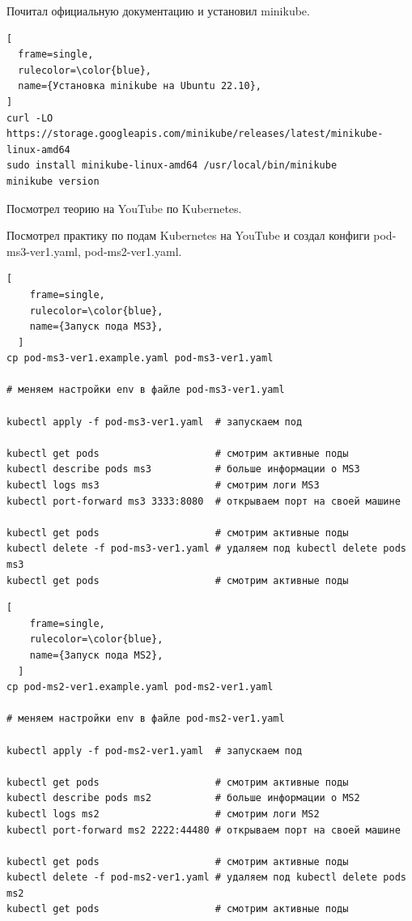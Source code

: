 \documentclass[12pt, a4paper, simple]{eskdtext}
\begin{document}
  Почитал официальную документацию \cite{kubernetes_install_minikube} и установил minikube.

\begin{lstlisting}[
  frame=single,
  rulecolor=\color{blue},
  name={Установка minikube на Ubuntu 22.10},
]
curl -LO https://storage.googleapis.com/minikube/releases/latest/minikube-linux-amd64
sudo install minikube-linux-amd64 /usr/local/bin/minikube
minikube version
\end{lstlisting}

  Посмотрел теорию на YouTube \cite{kubernetes_theory} по Kubernetes.

  Посмотрел практику по подам Kubernetes на YouTube \cite{kubernetes_create_pod} и создал конфиги pod-ms3-ver1.yaml, pod-ms2-ver1.yaml.

  \newpage
  

  \begin{lstlisting}[
    frame=single,
    rulecolor=\color{blue},
    name={Запуск пода MS3},
  ]
cp pod-ms3-ver1.example.yaml pod-ms3-ver1.yaml

# меняем настройки env в файле pod-ms3-ver1.yaml

kubectl apply -f pod-ms3-ver1.yaml  # запускаем под

kubectl get pods                    # смотрим активные поды
kubectl describe pods ms3           # больше информации о MS3
kubectl logs ms3                    # смотрим логи MS3
kubectl port-forward ms3 3333:8080  # открываем порт на своей машине

kubectl get pods                    # смотрим активные поды
kubectl delete -f pod-ms3-ver1.yaml # удаляем под kubectl delete pods ms3
kubectl get pods                    # смотрим активные поды
\end{lstlisting}

  \newpage

  

  \newpage

  \begin{lstlisting}[
    frame=single,
    rulecolor=\color{blue},
    name={Запуск пода MS2},
  ]
cp pod-ms2-ver1.example.yaml pod-ms2-ver1.yaml

# меняем настройки env в файле pod-ms2-ver1.yaml

kubectl apply -f pod-ms2-ver1.yaml  # запускаем под

kubectl get pods                    # смотрим активные поды
kubectl describe pods ms2           # больше информации о MS2
kubectl logs ms2                    # смотрим логи MS2
kubectl port-forward ms2 2222:44480 # открываем порт на своей машине

kubectl get pods                    # смотрим активные поды
kubectl delete -f pod-ms2-ver1.yaml # удаляем под kubectl delete pods ms2
kubectl get pods                    # смотрим активные поды
\end{lstlisting}
\end{document}
